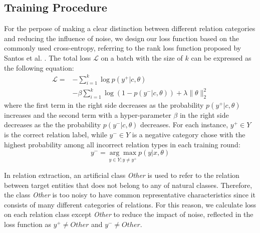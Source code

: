\documentclass[conference]{IEEEtran}
\begin{document}
\subsection{Training Procedure}
For the perpose of making a clear distinction between different relation categories and reducing the influence of noise, we design our loss function based on the commonly used cross-entropy, referring to the rank loss function proposed by Santos et al. \cite{dos2015classifying}. The total loss \begin{math} \mathcal{L} \end{math} on a batch with the size of \begin{math} k \end{math} can be expressed as the following equation:
\begin{equation}
\begin{aligned}
\mathcal{L} =&-\sum_{i=1}^{k}\log p\left(y ^{+} | c, \theta\right)\\
 &-\beta \sum_{i=1}^{k} \log \left(1-p\left(y ^{-} | c, \theta\right)\right) + \lambda \| \theta \|_{2}^{2}
\end{aligned}
\end{equation}
where the first term in the right side decreases as the probability \begin{math} p\left(y ^{+} | c, \theta\right) \end{math} increases and the second term with a hyper-parameter \begin{math} \beta \end{math} in the right side decreases as the the probability \begin{math} p\left(y ^{-} | c, \theta\right) \end{math} decreases. For each instance, \begin{math} y ^{+} \in Y \end{math} is the correct relation label, while \begin{math} y ^{-} \in Y \end{math} is a negative category chose with the highest probability among all incorrect relation types in each training round:
\begin{equation}
y^{-}=\underset{y \in Y ; y \neq y^{+}}{\arg \max} p\left(y | x, \theta\right)
\end{equation}

In relation extraction, an artificial class {\em Other} is used to refer to the relation between target entities that does not belong to any of natural classes. Therefore, the class {\em Other} is too noisy to have common representative characteristics since it consists of many different categories of relations. For this reason, we calculate loss on each relation class except {\em Other} to reduce the impact of noise, reflected in the loss function as \begin{math} y ^{+} \neq Other \end{math} and \begin{math} y ^{-} \neq Other \end{math}.
\end{document}
